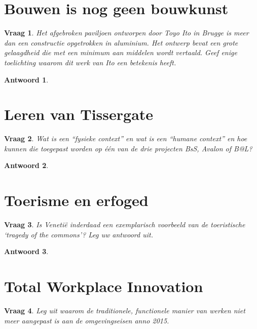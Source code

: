 \documentclass{article}
\theoremstyle{plain}
\newtheorem{question}{Vraag}
\theoremstyle{nonumberplain}
\newtheorem{answer}{Antwoord}
\begin{document}
\section{Bouwen is nog geen bouwkunst}

\begin{question}
Het afgebroken paviljoen ontworpen door Toyo Ito in Brugge is meer dan een
constructie opgetrokken in aluminium. Het ontwerp bevat een grote gelaagdheid
die met een minimum aan middelen wordt vertaald. Geef enige toelichting waarom
dit werk van Ito een betekenis heeft.
\end{question}

\begin{answer}

\end{answer}

\section{Leren van Tissergate}

\begin{question}
Wat is een “fysieke context” en wat is een “humane context” en hoe kunnen die
toegepast worden op één van de drie projecten BsS, Avalon of B@L?
\end{question}

\begin{answer}

\end{answer}

\section{Toerisme en erfoged}

\begin{question}
Is Venetië inderdaad een exemplarisch voorbeeld van de toeristische ‘tragedy of
the commons’? Leg uw antwoord uit.
\end{question}

\begin{answer}

\end{answer}

\section{Total Workplace Innovation}

\begin{question}
Leg uit waarom de traditionele, functionele manier van werken niet meer
aangepast is aan de omgevingseisen anno 2015.
\end{question}
\end{document}
